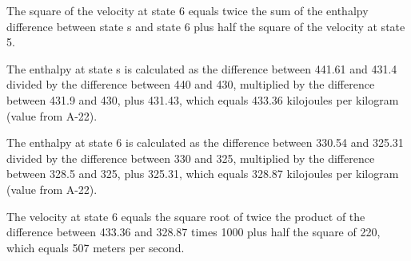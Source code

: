The square of the velocity at state 6 equals twice the sum of the enthalpy difference between state s and state 6 plus half the square of the velocity at state 5.

The enthalpy at state s is calculated as the difference between 441.61 and 431.4 divided by the difference between 440 and 430, multiplied by the difference between 431.9 and 430, plus 431.43, which equals 433.36 kilojoules per kilogram (value from A-22).

The enthalpy at state 6 is calculated as the difference between 330.54 and 325.31 divided by the difference between 330 and 325, multiplied by the difference between 328.5 and 325, plus 325.31, which equals 328.87 kilojoules per kilogram (value from A-22).

The velocity at state 6 equals the square root of twice the product of the difference between 433.36 and 328.87 times 1000 plus half the square of 220, which equals 507 meters per second.